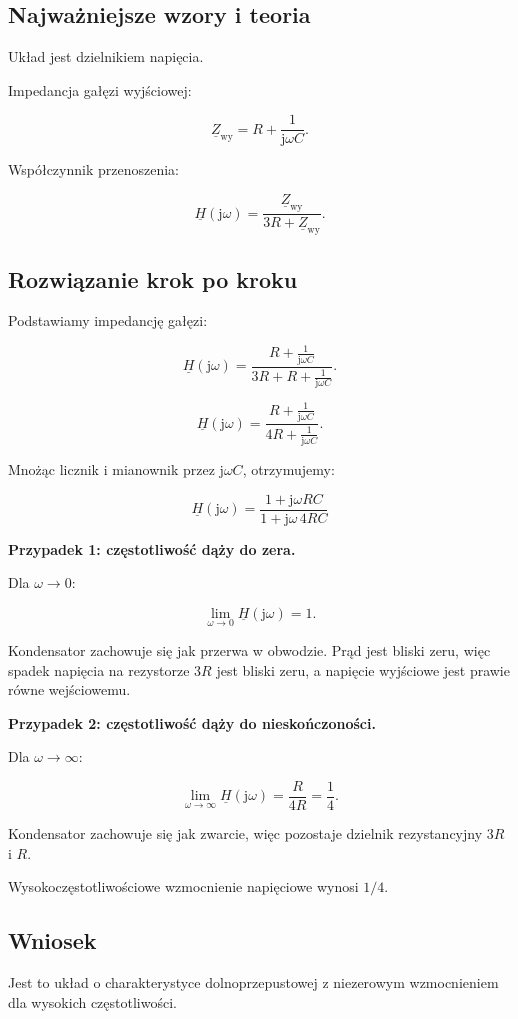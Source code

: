 \documentclass[12pt,a4paper]{article}
\newcommand{\jw}{\mathrm{j}\omega}
\newcommand{\Z}{\underline{Z}}
\newcommand{\Htr}{\underline{H}}
\begin{document}
\subsection*{Najważniejsze wzory i teoria}

Układ jest dzielnikiem napięcia.

Impedancja gałęzi wyjściowej:

\[
\Z_{\mathrm{wy}}
=
R+\frac{1}{\jw C}.
\]

Współczynnik przenoszenia:

\[
\Htr(\jw)=
\frac{\Z_{\mathrm{wy}}}
{3R+\Z_{\mathrm{wy}}}.
\]

\subsection*{Rozwiązanie krok po kroku}

Podstawiamy impedancję gałęzi:

\[
\Htr(\jw)=
\frac{R+\frac{1}{\jw C}}
{3R+R+\frac{1}{\jw C}}.
\]

\[
\Htr(\jw)=
\frac{R+\frac{1}{\jw C}}
{4R+\frac{1}{\jw C}}.
\]

Mnożąc licznik i mianownik przez $\jw C$, otrzymujemy:

\[
\boxed{
\Htr(\jw)=
\frac{1+\jw RC}{1+\jw\,4RC}
}
\]

\textbf{Przypadek 1: częstotliwość dąży do zera.}

Dla $\omega\to0$:

\[
\lim_{\omega\to0}\Htr(\jw)=1.
\]

Kondensator zachowuje się jak przerwa w obwodzie.
Prąd jest bliski zeru, więc spadek napięcia na rezystorze $3R$
jest bliski zeru, a napięcie wyjściowe jest prawie równe wejściowemu.

\textbf{Przypadek 2: częstotliwość dąży do nieskończoności.}

Dla $\omega\to\infty$:

\[
\lim_{\omega\to\infty}\Htr(\jw)
=
\frac{R}{4R}
=
\frac14.
\]

Kondensator zachowuje się jak zwarcie,
więc pozostaje dzielnik rezystancyjny $3R$ i $R$.

Wysokoczęstotliwościowe wzmocnienie napięciowe wynosi $1/4$.

\subsection*{Wniosek}

Jest to układ o charakterystyce dolnoprzepustowej
z niezerowym wzmocnieniem dla wysokich częstotliwości.
\end{document}
